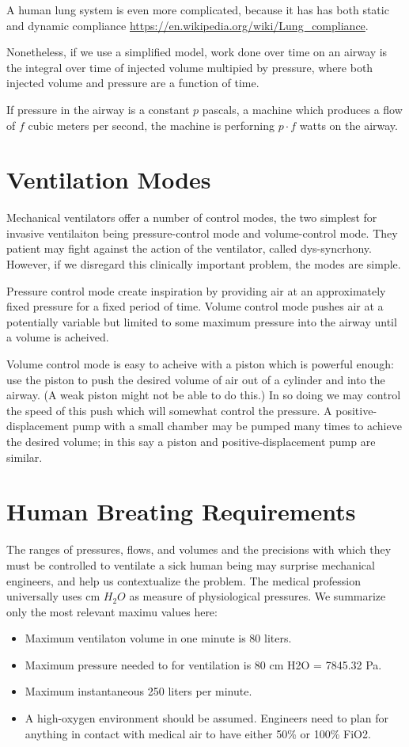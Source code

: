 \documentclass{article}
\begin{document}
A human lung system is even more
complicated, because it has has
both static and dynamic compliance \url{https://en.wikipedia.org/wiki/Lung_compliance}.

Nonetheless, if we use a simplified model, work done over time
on an airway is the integral over time of injected volume
multipied by pressure, where both injected volume and
pressure are a function of time.

If pressure in the airway is a constant $p$ pascals, a machine which produces a flow of $f$ cubic meters
per second, the machine is perforning $p \cdot f$ watts on the airway.


\section{Ventilation Modes}

Mechanical ventilators offer a number of control modes, the two
simplest for invasive ventilaiton
being pressure-control mode and volume-control mode.
They patient may fight against the action of the ventilator,
called dys-syncrhony. However, if we disregard this clinically
important problem, the modes are simple.

Pressure control mode create inspiration by providing air
at an approximately fixed pressure for a fixed period of time.
Volume control mode pushes air at a potentially variable but
limited to some maximum pressure into the airway until a volume
is acheived.

Volume control mode is easy to acheive with a piston which is
powerful enough: use the piston to push the desired volume of
air out of a cylinder and into the airway. (A weak piston might
not be able to do this.) In so doing we may control the speed
of this push which will somewhat control the pressure.
A positive-displacement pump with a small chamber may be pumped
many times to achieve the desired volume; in this say a
piston and positive-displacement pump are similar.

\section{Human Breating Requirements}

The ranges of pressures, flows, and volumes and the precisions with which
they must be controlled to ventilate a sick human being may surprise
mechanical engineers, and help us contextualize the problem.
The medical profession universally uses cm $H_2O$ as measure of physiological
pressures. We summarize only the most relevant maximu values here:
\begin{itemize}
\item Maximum ventilaton volume in one minute is 80 liters.
\item Maximum pressure needed to for ventilation is 80 cm H2O = 7845.32 Pa.
\item Maximum instantaneous  250 liters per minute.
\item A high-oxygen environment should be assumed. Engineers need to plan for anything
  in contact with medical air to have either 50\% or 100\% FiO2.
  \end{itemize}
\end{document}
